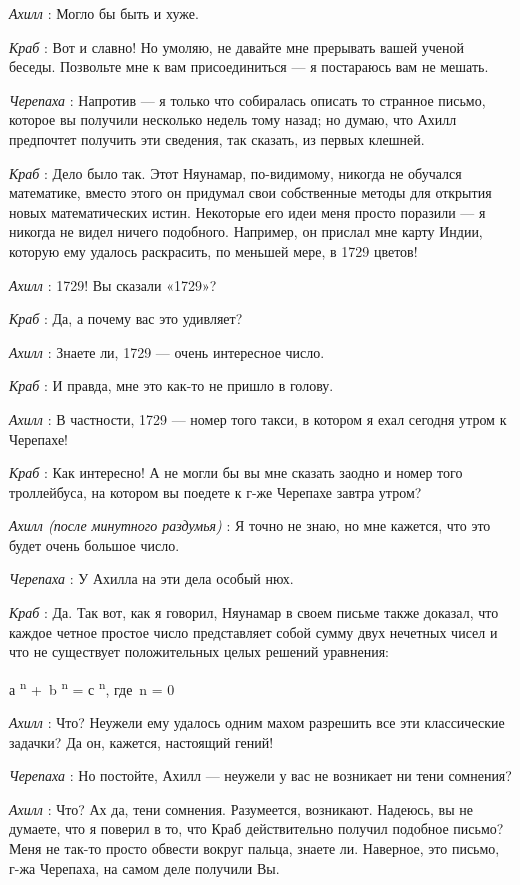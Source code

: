 \emph{Ахилл} : Могло бы быть и хуже.

\emph{Краб} : Вот и славно! Но умоляю, не давайте мне прерывать вашей ученой беседы. Позвольте мне к вам присоединиться --- я постараюсь вам не мешать.

\emph{Черепаха} : Напротив --- я только что собиралась описать то странное письмо, которое вы получили несколько недель тому назад; но думаю, что Ахилл предпочтет получить эти сведения, так сказать, из первых клешней.

\emph{Краб} : Дело было так. Этот Няунамар, по-видимому, никогда не обучался математике, вместо этого он придумал свои собственные методы для открытия новых математических истин. Некоторые его идеи меня просто поразили --- я никогда не видел ничего подобного. Например, он прислал мне карту Индии, которую ему удалось раскрасить, по меньшей мере, в 1729 цветов!

\emph{Ахилл} : 1729! Вы сказали «1729»?

\emph{Краб} : Да, а почему вас это удивляет?

\emph{Ахилл} : Знаете ли, 1729 --- очень интересное число.

\emph{Краб} : И правда, мне это как-то не пришло в голову.

\emph{Ахилл} : В частности, 1729 --- номер того такси, в котором я ехал сегодня утром к Черепахе!

\emph{Краб} : Как интересно! А не могли бы вы мне сказать заодно и номер того троллейбуса, на котором вы поедете к г-же Черепахе завтра утром?

\emph{Ахилл (после минутного раздумья)} : Я точно не знаю, но мне кажется, что это будет очень большое число.

\emph{Черепаха} : У Ахилла на эти дела особый нюх.

\emph{Краб} : Да. Так вот, как я говорил, Няунамар в своем письме также доказал, что каждое четное простое число представляет собой сумму двух нечетных чисел и что не существует положительных целых решений уравнения:

а \textsuperscript{n} +~b \textsuperscript{n} = с \textsuperscript{n}, где~n = 0

\emph{Ахилл} : Что? Неужели ему удалось одним махом разрешить все эти классические задачки? Да он, кажется, настоящий гений!

\emph{Черепаха} : Но постойте, Ахилл --- неужели у вас не возникает ни тени сомнения?

\emph{Ахилл} : Что? Ах да, тени сомнения. Разумеется, возникают. Надеюсь, вы не думаете, что я поверил в то, что Краб действительно получил подобное письмо? Меня не так-то просто обвести вокруг пальца, знаете ли. Наверное, это письмо, г-жа Черепаха, на самом деле получили Вы.

